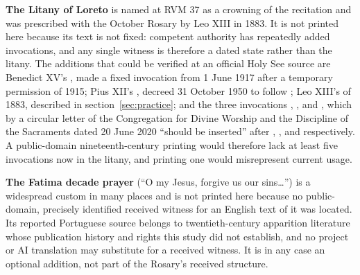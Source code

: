 \textbf{The Litany of Loreto} is named at RVM 37 as a crowning of the
recitation and was prescribed with the October Rosary by Leo XIII in
1883. It is not printed here because its text is not fixed: competent
authority has repeatedly added invocations, and any single witness is
therefore a dated state rather than the litany. The additions that could
be verified at an official Holy See source are Benedict XV's
, made a fixed invocation from 1 June 1917 after a
temporary permission of 1915; Pius XII's ,
decreed 31 October 1950 to follow ; Leo XIII's  of 1883,
described in section~\ref{sec:practice}; and the three invocations
, , and , which by a circular letter of the Congregation for Divine
Worship and the Discipline of the Sacraments dated 20 June 2020 ``should
be inserted'' after , ,
and  respectively. A public-domain
nineteenth-century printing would therefore lack at least five
invocations now in the litany, and printing one would misrepresent
current usage.

\textbf{The Fatima decade prayer} (``O my Jesus, forgive us our
sins\ldots'') is a widespread custom in many places and is not printed
here because no public-domain, precisely identified received witness for
an English text of it was located. Its reported Portuguese source
belongs to twentieth-century apparition literature whose publication
history and rights this study did not establish, and no project or AI
translation may substitute for a received witness. It is in any case an
optional addition, not part of the Rosary's received structure.

